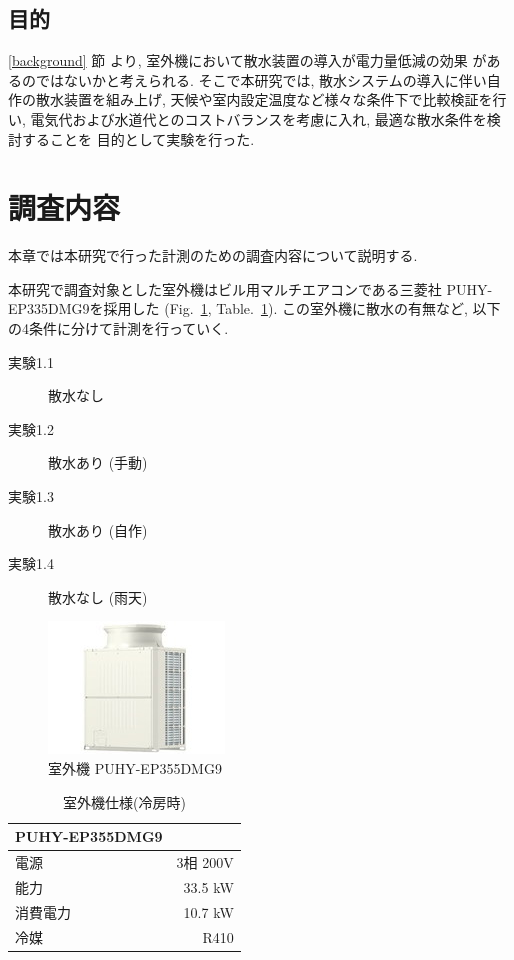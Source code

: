 \documentclass[a4j,fleqn,dvipdfmx,uplatex]{jsarticle}
\newcommand{\figref}[1]{Fig.\ \ref{#1}}
\newcommand{\tableref}[1]{Table.\ \ref{#1}}
\newcommand{\subsecref}[1]{\ref{#1}\hspace{0.2zw} 節}
\begin{document}
\subsection{目的}\label{purpose}
\subsecref{background} より, 室外機において散水装置の導入が電力量低減の効果
があるのではないかと考えられる. 
そこで本研究では, 散水システムの導入に伴い自作の散水装置を組み上げ, 
天候や室内設定温度など様々な条件下で比較検証を行い, 
電気代および水道代とのコストバランスを考慮に入れ, 最適な散水条件を検討することを
目的として実験を行った. 

\section{調査内容}\label{sec2}
本章では本研究で行った計測のための調査内容について説明する. 

本研究で調査対象とした室外機はビル用マルチエアコンである三菱社 
PUHY-EP335DMG9\cite{condensing_unit}を採用した (\figref{fig:condensing_unit}, \tableref{table:hard}). 
この室外機に散水の有無など, 以下の4条件に分けて計測を行っていく.  

\begin{description}
  \item[  実験1.1 ] 散水なし
  \item[  実験1.2 ] 散水あり (手動)
  \item[  実験1.3 ] 散水あり (自作)
  \item[  実験1.4 ] 散水なし (雨天)
\end{description}

\begin{figure}[htb]
  \centering
  \includegraphics[width=0.7\linewidth]{img/PUHY-EP335DMG9.jpg}
  \caption{室外機 PUHY-EP355DMG9}
  \label{fig:condensing_unit}
\end{figure}

\begin{table}[htb]
  \caption{室外機仕様(冷房時)}
  \label{table:hard}
  \centering
  \begin{tabular}{lr}
    PUHY-EP355DMG9 & \\
    \hline \hline
    電源 & 3相 200V \\
    能力 & 33.5 kW \\
    消費電力 & 10.7 kW \\
    冷媒 & R410 \\
    \hline
  \end{tabular}
\end{table}
\end{document}
